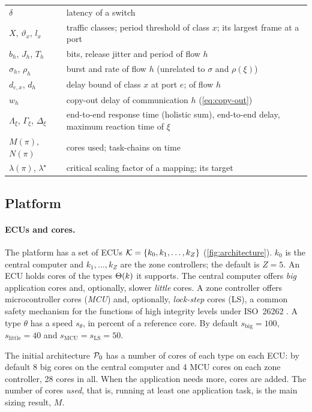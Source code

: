 \begin{table}[t]
\begin{tabularx}{\columnwidth}{@{}lX@{}}
$\delta$ & latency of a switch \\
$X$, $\vartheta_x$, $l_x$ & traffic classes; period threshold of class $x$; its largest frame at a port \\
$b_h$, $J_h$, $T_h$ & bits, release jitter and period of flow $h$ \\
$\sigma_h$, $\rho_h$ & burst and rate of flow $h$ (unrelated to $\sigma$ and $\rho(\xi)$) \\
$d_{e,x}$, $d_h$ & delay bound of class $x$ at port $e$; of flow $h$ \\
$w_h$ & copy-out delay of communication $h$ (\cref{eq:copy-out}) \\
$\Lambda_\xi$, $\Gamma_\xi$, $\Delta_\xi$ & end-to-end response time (holistic sum), end-to-end delay, maximum reaction time of $\xi$ \\
$M(\pi)$, $N(\pi)$ & cores used; task-chains on time \\
$\lambda(\pi)$, $\lambda^\star$ & critical scaling factor of a mapping; its target \\
\bottomrule
\end{tabularx}
\end{table}

\subsection{Platform}
\label{sec:platform}

\paragraph{ECUs and cores.} The platform has a set of ECUs $\mathcal{K}=\{k_0,
k_1,\dots,k_Z\}$ (\cref{fig:architecture}). $k_0$ is the central computer
and $k_1,\dots,k_Z$ are the zone controllers; the default is $Z=5$. An ECU
holds cores of the types $\Theta(k)$ it supports. The central computer
offers \emph{big} application cores and, optionally, slower \emph{little}
cores. A zone controller offers microcontroller cores (\emph{MCU}) and,
optionally, \emph{lock-step} cores (LS), a common safety mechanism for
the functions of high integrity levels under ISO~26262 \cite{iso26262}. A type $\theta$ has a speed $s_\theta$, in percent of
a reference core. By default $s_{\mathrm{big}}=100$, $s_{\mathrm{little}}
=40$ and $s_{\mathrm{MCU}}=s_{\mathrm{LS}}=50$.

The initial architecture $\mathcal{P}_0$ has a number of cores of each type on
each ECU: by default 8 big cores on the central computer and 4 MCU cores on
each zone controller, 28 cores in all. When the application needs more,
cores are added. The number of cores \emph{used}, that is, running at least
one application task, is the main sizing result, $M$.

